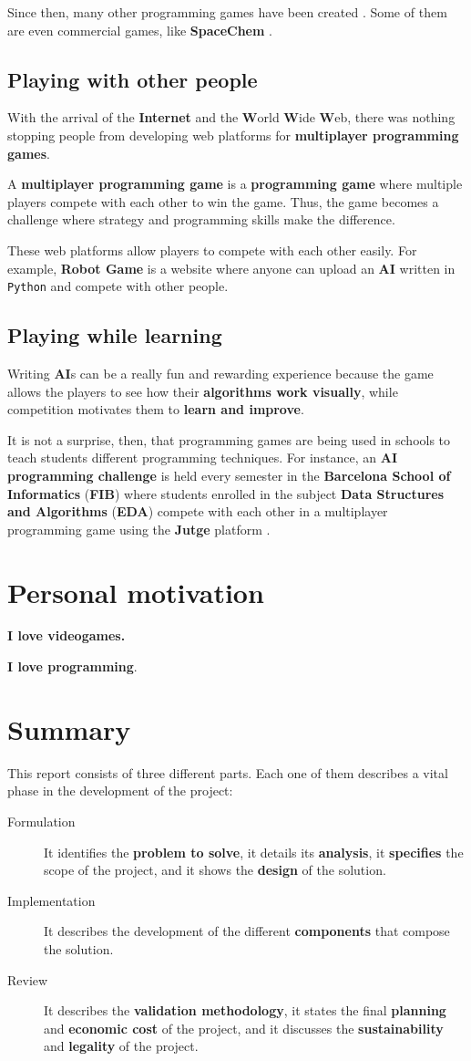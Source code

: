 \documentclass[a4paper,11pt,titlepage,abstract,numbers=noenddot,automark,mnsy,intlimits,rgb,dvipsnames]{report}
\begin{document}
Since then, many other programming games have been created \cite{pg}. Some of them are even commercial games, like
\textbf{SpaceChem} \cite{spacechem}.
\subsection{Playing with other people}
With the arrival of the \textbf{Internet} and the \textbf{W}orld \textbf{W}ide \textbf{W}eb, there was nothing stopping people from
developing web platforms for \textbf{multiplayer programming games}.

A \textbf{multiplayer programming game} is a \textbf{programming game} where multiple players compete with each other to win the
game. Thus, the game becomes a challenge where strategy and programming skills make the difference.

These web platforms allow players to compete with each other easily. For example, \textbf{Robot Game}
\cite{robotgame} is a website where anyone can upload an \textbf{AI} written in \texttt{Python} and compete with other people.
\subsection{Playing while learning}
Writing \textbf{AI}s can be a really fun and rewarding experience because the game allows the players to see how their
\textbf{algorithms work visually}, while competition motivates them to \textbf{learn and improve}.

It is not a surprise, then, that programming games are being used in schools to teach students different programming
techniques. For instance, an \textbf{AI programming challenge} is held every semester in the \textbf{Barcelona School of
Informatics} (\textbf{FIB}) where students enrolled in the subject \textbf{Data Structures and Algorithms} (\textbf{EDA}) \cite{eda}
compete with each other in a multiplayer programming game using the \textbf{Jutge} platform \cite{jutge}.
\section{Personal motivation}
\textbf{I love videogames.}

\textbf{I love programming}. 
\section{Summary}
This report consists of three different parts. Each one of them describes a vital phase in the development of
the project:
\begin{description}
\item[Formulation]
It identifies the \textbf{problem to solve}, it details its \textbf{analysis}, it \textbf{specifies} the scope of
  the project, and it shows the \textbf{design} of the solution.
\item[Implementation]
It describes the development of the different \textbf{components} that compose the solution.
\item[Review]
It describes the \textbf{validation methodology}, it states the final \textbf{planning} and \textbf{economic cost}
  of the project, and it discusses the \textbf{sustainability} and \textbf{legality} of the project.
\end{description}
\end{document}
